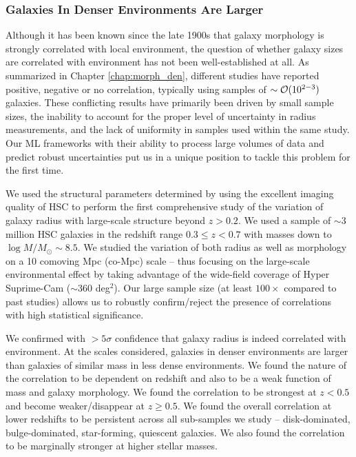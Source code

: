 \subsubsection{Galaxies In Denser Environments Are Larger} \label{sec_conc:morph_den} 

Although it has been known since the late 1900s that galaxy morphology is strongly correlated with local environment, the question of whether galaxy sizes are correlated with environment has not been well-established at all. As summarized in Chapter \ref{chap:morph_den}, different studies have reported positive, negative or no correlation, typically using samples of $\sim \mathcal{O}(10^{2-3})$ galaxies. These conflicting results have primarily been driven by small sample sizes, the inability to account for the proper level of uncertainty in radius measurements, and the lack of uniformity in samples used within the same study. Our ML frameworks with their ability to process large volumes of data and predict robust uncertainties put us in a unique position to tackle this problem for the first time. 

We used the structural parameters determined by \gampen{} using the excellent imaging quality of HSC to perform the first comprehensive study of the variation of galaxy radius with large-scale structure beyond $z > 0.2$. We used a sample of $\sim3$ million HSC galaxies in the redshift range $0.3 \leq z < 0.7$ with masses down to $\log M/M_{\odot}\sim8.5$. We studied the variation of both radius as well as morphology on a 10 comoving Mpc (co-Mpc) scale -- thus focusing on the large-scale environmental effect by taking advantage of the wide-field coverage of Hyper Suprime-Cam ($\sim 360$ deg$^2$). Our large sample size (at least $100\times$ compared to past studies) allows us to robustly confirm/reject the presence of correlations with high statistical significance. 

We confirmed with $>5\sigma$ confidence that galaxy radius is indeed correlated with environment. At the scales considered, galaxies in denser environments are larger than galaxies of similar mass in less dense environments. We found the nature of the correlation to be dependent on redshift and also to be a weak function of mass and galaxy morphology. We found the correlation to be strongest at $z < 0.5$ and become weaker/disappear at $z \geq 0.5$. We found the overall correlation at lower redshifts to be persistent across all sub-samples we study -- disk-dominated, bulge-dominated, star-forming, quiescent galaxies. We also found the correlation to be marginally stronger at higher stellar masses. 

